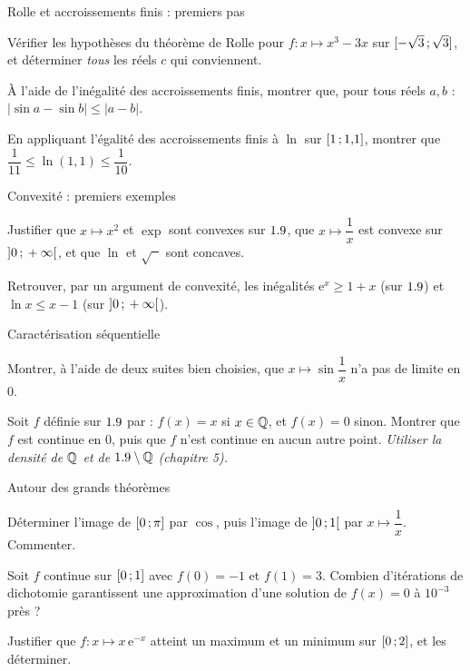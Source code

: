 \begin{exercice}[1]{Rolle et accroissements finis : premiers pas}
\begin{questions}
  \item Vérifier les hypothèses du théorème de Rolle pour
    $f:x\mapsto x^{3}-3x$ sur $\mathopen{[}-\sqrt3\,{;}\,\sqrt3\mathclose{]}$, et déterminer
    \emph{tous} les réels $c$ qui conviennent.
  \item À l'aide de l'inégalité des accroissements finis, montrer que, pour
    tous réels $a,b$ : $|\sin a-\sin b|\leq|a-b|$.
  \item En appliquant l'égalité des accroissements finis à $\ln$ sur
    $\mathopen{[}1\,{;}\,1{,}1\mathclose{]}$, montrer que
    $\dfrac{1}{11}\leq\ln(1{,}1)\leq\dfrac{1}{10}$.
\end{questions}
\end{exercice}

\begin{exercice}[1]{Convexité : premiers exemples}
\begin{questions}
  \item Justifier que $x\mapsto x^{2}$ et $\exp$ sont convexes sur $1.9$, que
    $x\mapsto\dfrac1x$ est convexe sur $\mathopen{]}0\,{;}\,+\infty\mathclose{[}$, et que $\ln$ et
    $\sqrt{\phantom{x}}$ sont concaves.
  \item Retrouver, par un argument de convexité, les inégalités
    $\mathrm{e}^{x}\geq1+x$ (sur $1.9$) et $\ln x\leq x-1$ (sur
    $\mathopen{]}0\,{;}\,+\infty\mathclose{[}$).
\end{questions}
\end{exercice}


\begin{exercice}[2]{Caractérisation séquentielle}
\begin{questions}
  \item Montrer, à l'aide de deux suites bien choisies, que
    $x\mapsto\sin\dfrac1x$ n'a pas de limite en $0$.
  \item Soit $f$ définie sur $1.9$ par : $f(x)=x$ si $x\in\mathbb{Q}$, et $f(x)=0$
    sinon. Montrer que $f$ est continue en $0$, puis que $f$ n'est continue
    en aucun autre point. \emph{Utiliser la densité de $\mathbb{Q}$ et de
    $1.9\setminus\mathbb{Q}$ (chapitre 5).}
\end{questions}
\end{exercice}

\begin{exercice}[2]{Autour des grands théorèmes}
\begin{questions}
  \item Déterminer l'image de $\mathopen{[}0\,{;}\,\pi\mathclose{]}$ par $\cos$, puis l'image de
    $\mathopen{]}0\,{;}\,1\mathclose{[}$ par $x\mapsto\dfrac1x$. Commenter.
  \item Soit $f$ continue sur $\mathopen{[}0\,{;}\,1\mathclose{]}$ avec $f(0)=-1$ et $f(1)=3$.
    Combien d'itérations de dichotomie garantissent une approximation d'une
    solution de $f(x)=0$ à $10^{-3}$ près ?
  \item Justifier que $f:x\mapsto x\,\mathrm{e}^{-x}$ atteint un maximum et
    un minimum sur $\mathopen{[}0\,{;}\,2\mathclose{]}$, et les déterminer.
\end{questions}
\end{exercice}

